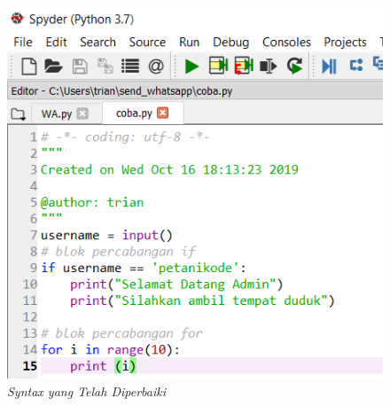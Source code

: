 \begin{figure}[H]
    \centering
    \includegraphics[scale=0.8]{figures/indentasicoy}
    \caption{\textit{Syntax yang Telah Diperbaiki}}
    \label{Syntax Error1}
\end{figure}

